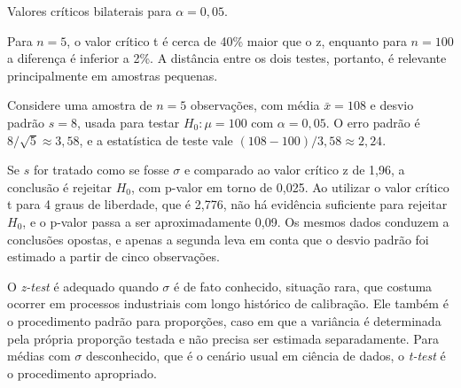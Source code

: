 {


\vspace{0.4em}
{\small Valores críticos bilaterais para $\alpha = 0{,}05$.}

\hspace*{1.5em}
Para $n = 5$, o valor crítico t é cerca de 40\% maior que o z,
enquanto para $n = 100$ a diferença é inferior a 2\%.
A distância entre os dois testes, portanto, é relevante principalmente em amostras pequenas.

\subtitle{Um exemplo numérico}

\hspace*{1.5em}
Considere uma amostra de $n = 5$ observações, com média $\bar{x} = 108$ e desvio padrão $s = 8$,
usada para testar $H_0: \mu = 100$ com $\alpha = 0{,}05$.
O erro padrão é $8/\sqrt{5} \approx 3{,}58$,
e a estatística de teste vale $(108 - 100)/3{,}58 \approx 2{,}24$.

\hspace*{1.5em}
Se $s$ for tratado como se fosse $\sigma$ e comparado ao valor crítico z de 1,96,
a conclusão é rejeitar $H_0$, com p-valor em torno de 0,025.
Ao utilizar o valor crítico t para 4 graus de liberdade, que é 2,776,
não há evidência suficiente para rejeitar $H_0$, e o p-valor passa a ser aproximadamente 0,09.
Os mesmos dados conduzem a conclusões opostas,
e apenas a segunda leva em conta que o desvio padrão foi estimado a partir de cinco observações.

\vspace{12mm}
\subtitle{Quando cada teste se aplica}

\hspace*{1.5em}
O \textit{z-test} é adequado quando $\sigma$ é de fato conhecido,
situação rara, que costuma ocorrer em processos industriais com longo histórico de calibração.
Ele também é o procedimento padrão para proporções,
caso em que a variância é determinada pela própria proporção testada
e não precisa ser estimada separadamente.
Para médias com $\sigma$ desconhecido, que é o cenário usual em ciência de dados,
o \textit{t-test} é o procedimento apropriado.

}

